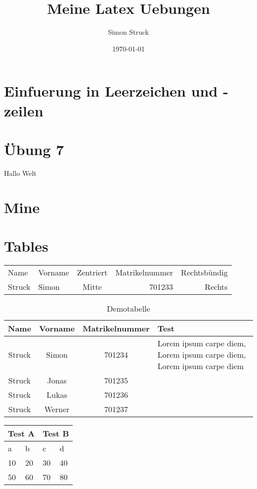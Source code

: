 \documentclass[a4paper,twoside,10pt]{article}
\title{Meine Latex Uebungen}
\author{Simon Struck}
\date{\today}
\begin{document}
	\maketitle
	\newpage
	\tableofcontents
	\newpage
	
	\section{Einfuerung in Leerzeichen und -zeilen}
	
	\newpage
	
	\begin{abstract}
		
	\end{abstract}
	
	\section{Übung 7}
	
	Hallo Welt
	
	
	\section{Mine}
	
	
	\section{Tables}
	
	\begin{tabular}{l|l|c|r|r}
		Name & Vorname & Zentriert & Matrikelnummer & Rechtsbündig \\
		Struck & Simon & Mitte & 701233 & Rechts \\
	\end{tabular}
	\begin{table}
		\centering
		\begin{tabular}{cccp{4cm}}
			\toprule
			\textbf{Name} & \textbf{Vorname} & \textbf{Matrikelnummer} & \textbf{Test}\\
			\midrule
			Struck & Simon & 701234 & Lorem ipsum carpe diem, Lorem ipsum carpe diem, Lorem ipsum carpe diem \\
			Struck & Jonas & 701235 \\
			Struck & Lukas & 701236 \\
			Struck & Werner & 701237 \\
			\bottomrule
		\end{tabular}
		\caption{Demotabelle}
		\label{tab:demotabelle}
	\end{table}
	
	\begin{table}
		\begin{tabular}{l|l|l|l}
			\multicolumn{2}{l|}{\textbf{Test A}} & \multicolumn{2}{l}{\textbf{Test B}} \\ \hline
			\cellcolor{blue!25} a &
			\cellcolor{blue!25} b &
			\cellcolor{blue!25} c &
			\cellcolor{blue!25} d \\ \hline
			10     & 20 & 30     & 40 \\
			50     & 60 & 70     & 80 \\
		\end{tabular}
	\end{table}
	
	\newpage
	\appendix
	\listoffigures
	\listoftables
\end{document}
